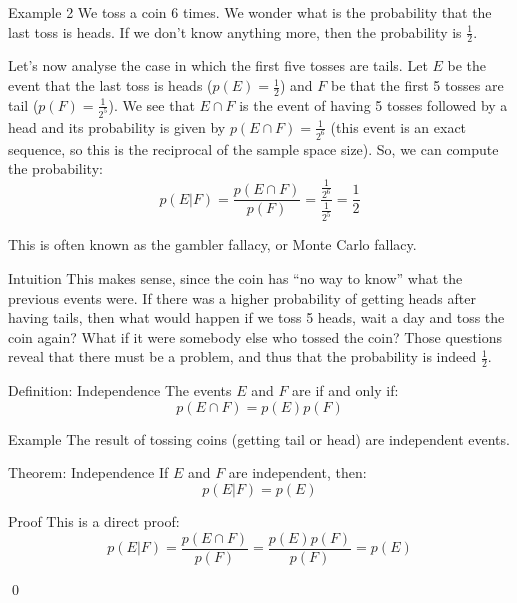\documentclass[a4paper]{article}
\begin{document}
\begin{parag}{Example 2}
    We toss a coin 6 times. We wonder what is the probability that the last toss is heads. If we don't know anything more, then the probability is $\frac{1}{2}$.

    Let's now analyse the case in which the first five tosses are tails. Let $E$ be the event that the last toss is heads ($p\left(E\right) = \frac{1}{2}$) and $F$ be that the first 5 tosses are tail ($p\left(F\right) = \frac{1}{2^{5}}$). We see that $E \cap F$ is the event of having 5 tosses followed by a head and its probability is given by $p\left(E \cap F\right) = \frac{1}{2^6}$ (this event is an exact sequence, so this is the reciprocal of the sample space size). So, we can compute the probability: 
    \[p\left(E | F\right) = \frac{p\left(E \cap F\right)}{p\left(F\right)} = \frac{\frac{1}{2^6}}{\frac{1}{2^5}} = \frac{1}{2}\]
    
    This is often known as the gambler fallacy, or Monte Carlo fallacy.

    \begin{subparag}{Intuition}
        This makes sense, since the coin has ``no way to know'' what the previous events were. If there was a higher probability of getting heads after having tails, then what would happen if we toss 5 heads, wait a day and toss the coin again? What if it were somebody else who tossed the coin? Those questions reveal that there must be a problem, and thus that the probability is indeed $\frac{1}{2}$.
    \end{subparag}
\end{parag}

\begin{parag}{Definition: Independence}
    The events $E$ and $F$ are  if and only if: 
    \[p\left(E \cap F\right) = p\left(E\right)p\left(F\right)\]

    \begin{subparag}{Example}
        The result of tossing coins (getting tail or head) are independent events.
    \end{subparag}
    
\end{parag}

\begin{parag}{Theorem: Independence}
    If $E$ and $F$ are independent, then: 
    \[p\left(E | F\right)= p\left(E\right)\]
    
    \begin{subparag}{Proof}
        This is a direct proof: 
        \[p\left(E | F\right) = \frac{p\left(E \cap F\right)}{p\left(F\right)} = \frac{p\left(E\right) p\left(F\right)}{p\left(F\right)} = p\left(E\right)\]
        
        \qed
    \end{subparag}
\end{parag}
\end{document}
